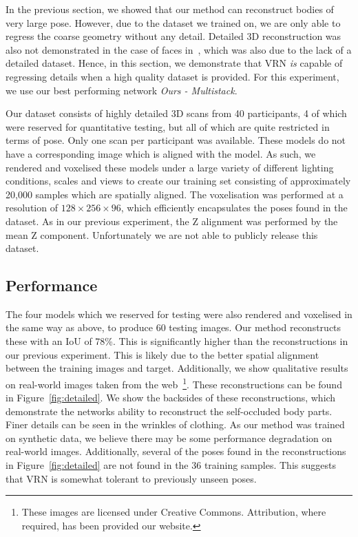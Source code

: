 In the previous section, we showed that our method can reconstruct
bodies of very large pose. However, due to the dataset we trained on,
we are only able to regress the coarse geometry without any
detail. Detailed 3D reconstruction was also not demonstrated in the
case of faces in~\cite{jackson2017vrn}, which was also due to the lack
of a detailed dataset. Hence, in this section, we demonstrate that VRN
\textit{is} capable of regressing details when a high quality dataset
is provided. For this experiment, we use our best performing network
\textit{Ours - Multistack}.

Our dataset consists of highly detailed 3D scans from 40 participants,
4 of which were reserved for quantitative testing, but all of which
are quite restricted in terms of pose. Only one scan per participant
was available. These models do not have a corresponding image which is
aligned with the model. As such, we rendered and voxelised these
models under a large variety of different lighting conditions, scales
and views to create our training set consisting of approximately
20,000 samples which are spatially aligned.  The voxelisation was
performed at a resolution of $128\times 256\times 96$, which
efficiently encapsulates the poses found in the dataset. As in our
previous experiment, the Z alignment was performed by the mean Z
component. Unfortunately we are not able to publicly release this
dataset.

\subsection{Performance}

The four models which we reserved for testing were also rendered and
voxelised in the same way as above, to produce 60 testing images. Our
method reconstructs these with an IoU of 78\%. This is significantly
higher than the reconstructions in our previous experiment. This is
likely due to the better spatial alignment between the training images
and target. Additionally, we show qualitative results on real-world
images taken from the web~\footnote{These images are licensed under
  Creative Commons. Attribution, where required, has been provided our
  website.}. These reconstructions can be found in
Figure~\ref{fig:detailed}. We show the backsides of these
reconstructions, which demonstrate the networks ability to reconstruct
the self-occluded body parts. Finer details can be seen in the
wrinkles of clothing. As our method was trained on synthetic data, we
believe there may be some performance degradation on real-world
images. Additionally, several of the poses found in the
reconstructions in Figure~\ref{fig:detailed} are not found in the 36
training samples. This suggests that VRN is somewhat tolerant to
previously unseen poses.


